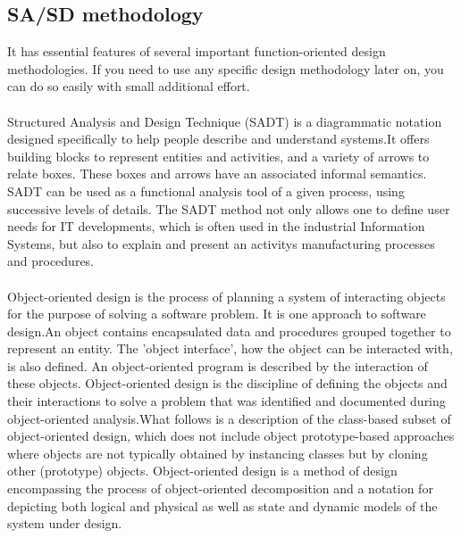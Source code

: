 \subsection{SA/SD methodology}
It has essential features of several important function-oriented design methodologies. If
you need to use any specific design methodology later on, you can do so easily with small
additional effort.\\\\
Structured Analysis and Design Technique (SADT) is a diagrammatic notation designed
specifically to help people describe and understand systems.It offers building blocks to
represent entities and activities, and a variety of arrows to relate boxes. These boxes and
arrows have an associated informal semantics. SADT can be used as a functional analysis
tool of a given process, using successive levels of details. The SADT method not only
allows one to define user needs for IT developments, which is often used in the industrial
Information Systems, but also to explain and present an activitys manufacturing processes
and procedures.\\\\
Object-oriented design is the process of planning a system of interacting objects for the purpose of solving a software problem. It is one approach to software design.An object contains encapsulated data and procedures grouped together to represent an entity. The 'object interface', how the object can be interacted with, is also defined. An object-oriented program is described by the interaction of these objects. Object-oriented design is the discipline of defining the objects and their interactions to solve a problem that was identified and documented during object-oriented analysis.What follows is a description of the class-based subset of object-oriented design, which does not include object prototype-based approaches where objects are not typically obtained by instancing classes but by cloning other (prototype) objects. Object-oriented design is a method of design encompassing the process of object-oriented decomposition and a notation for depicting both logical and physical as well as state and dynamic models of the system under design.\\\\
